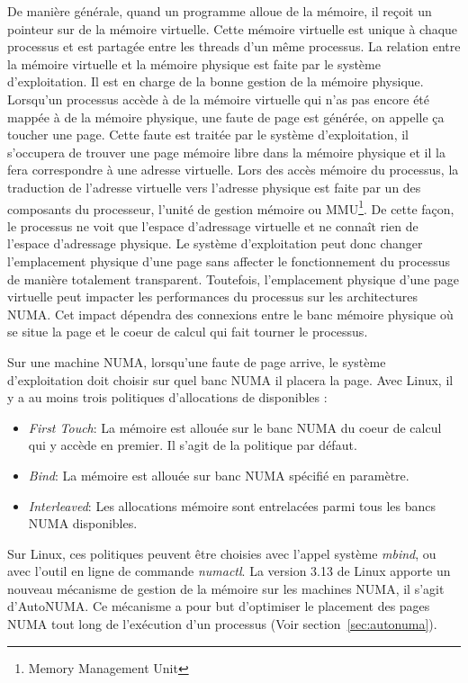 De manière générale, quand un programme alloue de la mémoire, il reçoit un pointeur sur de la mémoire virtuelle.
%
Cette mémoire virtuelle est unique à chaque processus et est partagée entre les threads d'un même processus.
%
La relation entre la mémoire virtuelle et la mémoire physique est faite par le système d'exploitation.
%
Il est en charge de la bonne gestion de la mémoire physique.
%
Lorsqu'un processus accède à de la mémoire virtuelle qui n'as pas encore été mappée à de la mémoire physique, une faute de page est générée, on appelle ça toucher une page.
%
Cette faute est traitée par le système d'exploitation, il s'occupera de trouver une page mémoire libre dans la mémoire physique et il la fera correspondre à une adresse virtuelle.
%
Lors des accès mémoire du processus, la traduction de l'adresse virtuelle vers l'adresse physique est faite par un des composants du processeur, l'unité de gestion mémoire ou MMU\footnote{Memory Management Unit}.
%
De cette façon, le processus ne voit que l'espace d'adressage virtuelle et ne connaît rien de l'espace d'adressage physique.
%
Le système d'exploitation peut donc changer l'emplacement physique d'une page sans affecter le fonctionnement du processus de manière totalement transparent.
%
Toutefois, l'emplacement physique d'une page virtuelle peut impacter les performances du processus sur les architectures NUMA.
%
Cet impact dépendra des connexions entre le banc mémoire physique où se situe la page et le coeur de calcul qui fait tourner le processus.


Sur une machine NUMA, lorsqu'une faute de page arrive, le système d'exploitation doit choisir sur quel banc NUMA il placera la page.
%
Avec Linux, il y a au moins trois politiques d'allocations de disponibles :
\begin{itemize}
        \item {\em First Touch}: La mémoire est allouée sur le banc NUMA du coeur de calcul qui y accède en premier.
                         Il s'agit de la politique par défaut.
        \item {\em Bind}: La mémoire est allouée sur banc NUMA spécifié en paramètre.
        \item {\em Interleaved}: Les allocations mémoire sont entrelacées parmi tous les bancs NUMA disponibles.
\end{itemize}
Sur Linux, ces politiques peuvent être choisies avec l'appel système {\em mbind}, ou avec l'outil en ligne de commande {\em numactl}.
%
La version 3.13 de Linux apporte un nouveau mécanisme de gestion de la mémoire sur les machines NUMA, il s'agit d'AutoNUMA.
%
Ce mécanisme a pour but d'optimiser le placement des pages NUMA tout long de l'exécution d'un processus (Voir section~\ref{sec:autonuma}).


